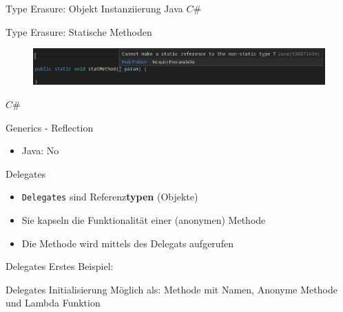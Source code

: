 \documentclass[11pt]{beamer}
\begin{document}
\begin{frame}{Type Erasure: Objekt Instanziierung}
	Java
	$C\#$
\end{frame}

\begin{frame}{Type Erasure: Statische Methoden}
	\begin{figure}
		\includegraphics[width=\textwidth]{bilder/java_no_static_methods.png}
	\end{figure}
	
	$C\#$
\end{frame}

\begin{frame}{Generics - Reflection}
\begin{itemize}
	\item Java: No 
\end{itemize}
\end{frame}


\begin{frame}{Delegates}
\begin{itemize}
 	\item \texttt{Delegates} sind Referenz\textbf{typen} (Objekte)
 	\item Sie kapseln die Funktionalität einer (anonymen) Methode
 	\item Die Methode wird mittels des Delegats aufgerufen
\end{itemize}
	
\end{frame}
\begin{frame}{Delegates}
	Erstes Beispiel:
\end{frame}

\begin{frame}{Delegates}
	Initialisierung Möglich als: Methode mit Namen, Anonyme Methode und Lambda Funktion
\end{frame}
\end{document}
